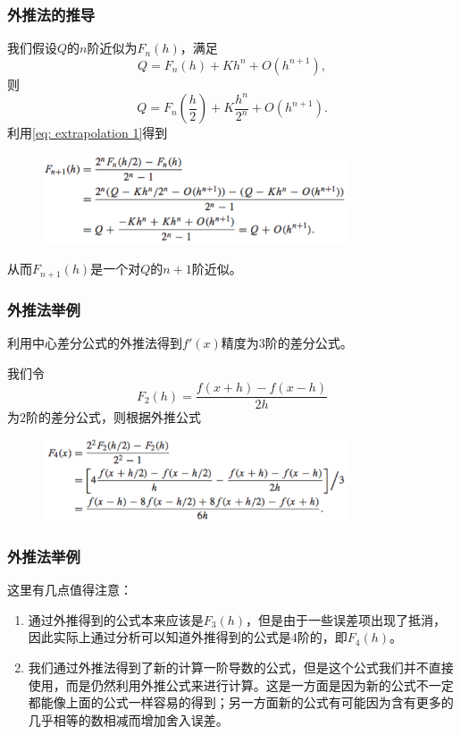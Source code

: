 \documentclass[10pt]{beamer}
\begin{document}
\begin{frame}
\frametitle{外推法的推导}
我们假设$Q$的$n$阶近似为$F_n(h)$，满足
\begin{equation}
Q = F_n(h) + Kh^n + O(h^{n+1}),
\end{equation}
则
\begin{equation}
Q = F_n(\frac{h}{2}) + K\frac{h^n}{2^n} + O(h^{n+1}).
\end{equation}
利用\eqref{eq: extrapolation 1}得到
\begin{figure}
\includegraphics[width=9cm]{figs/5-1-3_Extrapolation-1} 
\end{figure}
从而$F_{n+1}(h)$是一个对$Q$的$n+1$阶近似。
\end{frame}


\begin{frame}
\frametitle{外推法举例}
\begin{example}
利用中心差分公式的外推法得到$f'(x)$精度为$3$阶的差分公式。
\end{example}
我们令
\begin{equation}
F_2(h) = \frac{f(x+h) - f(x-h)}{2h}
\end{equation}
为$2$阶的差分公式，则根据外推公式
\begin{figure}
\includegraphics[width=9cm]{figs/5-1-3_Extrapolation-2} 
\end{figure}
\end{frame}

\begin{frame}
\frametitle{外推法举例}
这里有几点值得注意：
\begin{enumerate}
\item 通过外推得到的公式本来应该是$F_3(h)$，但是由于一些误差项出现了抵消，因此实际上通过分析可以知道外推得到的公式是$4$阶的，即$F_4(h)$。
\item 我们通过外推法得到了新的计算一阶导数的公式，但是这个公式我们并不直接使用，而是仍然利用外推公式来进行计算。这是一方面是因为新的公式不一定都能像上面的公式一样容易的得到；另一方面新的公式有可能因为含有更多的几乎相等的数相减而增加舍入误差。
\end{enumerate}
\end{frame}
\end{document}
